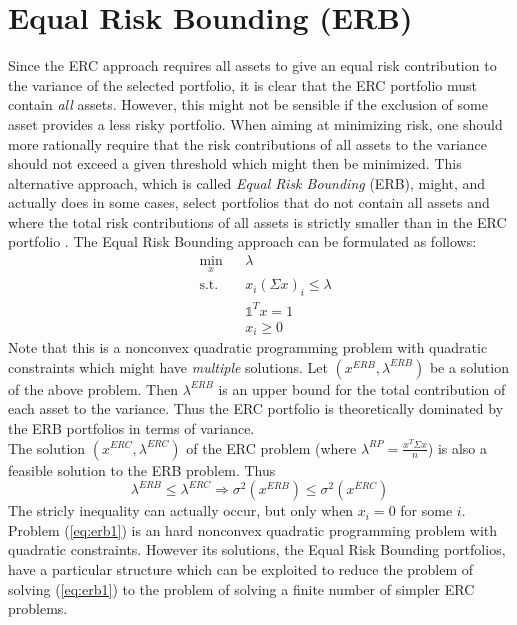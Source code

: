 \section{Equal Risk Bounding (ERB)}
Since the ERC approach requires all assets to give an equal risk contribution to the variance of the selected portfolio, it is clear that the ERC portfolio must contain \textit{all} assets\footnotemark[4]. However, this might not be sensible if the exclusion of some asset provides a less risky portfolio. When aiming at minimizing risk, one should more rationally require that the risk contributions of all assets to the variance should not exceed a given threshold which might then be minimized. This alternative approach, which is called \textit{Equal Risk Bounding} (ERB), might, and actually does in some cases, select portfolios that do not contain all assets and where the total risk contributions of all assets is strictly smaller than in the ERC portfolio \cite{erb}. The Equal Risk Bounding approach can be formulated as follows:
\begin{equation}\label{eq:erb1}
\begin{aligned}
& \min_x
& & \lambda\\
& \text{s.t.}
& & x_i (\Sigma x)_i \leq \lambda\\
&&&\mathds{1}^T x =1\\
&&&x_i \geq 0
\end{aligned}
\end{equation}
Note that this is a nonconvex quadratic programming problem with quadratic constraints which might have \textit{multiple} solutions. Let $(x^{ERB},\lambda^{ERB})$ be a solution of the above problem. Then $\lambda^{ERB}$ is an upper bound for the total contribution of each asset to the variance. Thus the ERC portfolio is theoretically dominated by the ERB portfolios in terms of variance.\\
The solution $(x^{ERC},\lambda^{ERC})$ of the ERC problem (where $\lambda^{RP} = \frac{x^{T} \Sigma x}{n}$) is also a feasible solution to the ERB problem. Thus
\begin{equation}
\lambda^{ERB} \leq \lambda^{ERC} \Rightarrow \sigma^2(x^{ERB}) \leq \sigma^2(x^{ERC})
\end{equation}
The stricly inequality can actually occur, but only when $x_i=0$ for some $i$.\\
Problem (\ref{eq:erb1}) is an hard nonconvex quadratic programming problem with quadratic constraints. However its solutions, the Equal Risk Bounding portfolios, have a particular structure which can be exploited to reduce the problem of solving (\ref{eq:erb1}) to the problem of solving a finite number of simpler ERC problems.
